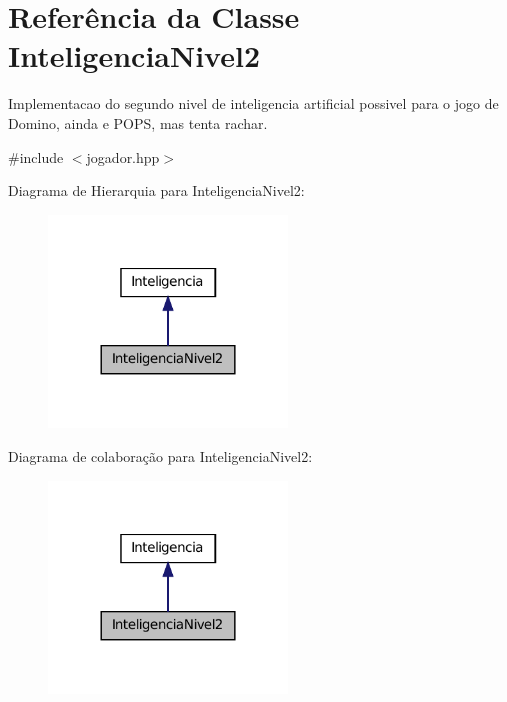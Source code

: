\hypertarget{classInteligenciaNivel2}{
\section{Referência da Classe InteligenciaNivel2}
\label{classInteligenciaNivel2}
}


Implementacao do segundo nivel de inteligencia artificial possivel para o jogo de Domino, ainda e POPS, mas tenta rachar.  




{\ttfamily \#include $<$jogador.hpp$>$}



Diagrama de Hierarquia para InteligenciaNivel2:\nopagebreak
\begin{figure}[H]
\begin{center}
\leavevmode
\includegraphics[width=180pt]{classInteligenciaNivel2__inherit__graph}
\end{center}
\end{figure}


Diagrama de colaboração para InteligenciaNivel2:\nopagebreak
\begin{figure}[H]
\begin{center}
\leavevmode
\includegraphics[width=180pt]{classInteligenciaNivel2__coll__graph}
\end{center}
\end{figure}

